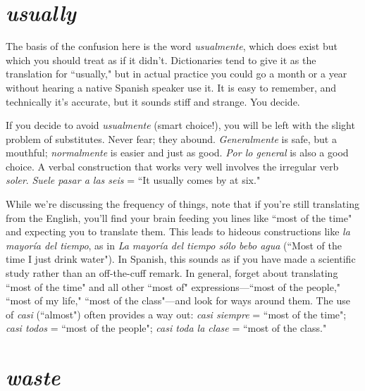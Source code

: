 \section{\emph{usually}}

The basis of the confusion here is the word \emph{usualmente},
which does exist but which you should treat as if it didn't. Dictionaries tend to give it as the translation for ``usually," but in actual practice you could go a month or a year without hearing a native Spanish
speaker use it. It is easy to remember, and technically it's accurate, but
it sounds stiff and strange. You decide.

If you decide to avoid \emph{usualmente} (smart choice!), you will be
left with the slight problem of substitutes. Never fear; they abound.
\emph{Generalmente} is safe, but a mouthful; \emph{normalmente} is easier and just
as good. \emph{Por lo general} is also a good choice. A verbal construction that
works very well involves the irregular verb \emph{soler}. \emph{Suele pasar a las seis}
= ``It usually comes by at six."

While we're discussing the frequency of things, note that if
you're still translating from the English, you'll find your brain feeding
you lines like ``most of the time" and expecting you to translate them.
This leads to hideous constructions like \emph{la mayoría del tiempo}, as in
\emph{La mayoría del tiempo sólo bebo agua} (``Most of the time I just drink
water"). In Spanish, this sounds as if you have made a scientific study
rather than an off-the-cuff remark. In general, forget about translating
``most of the time" and all other ``most of" expressions---``most of the
people," ``most of my life," ``most of the class"---and look for ways
around them. The use of \emph{casi} (``almost") often provides a way out: \emph{casi
siempre} = ``most of the time"; \emph{casi todos} = ``most of the people";
\emph{casi toda la clase} = ``most of the class."

\section{\emph{waste}}

